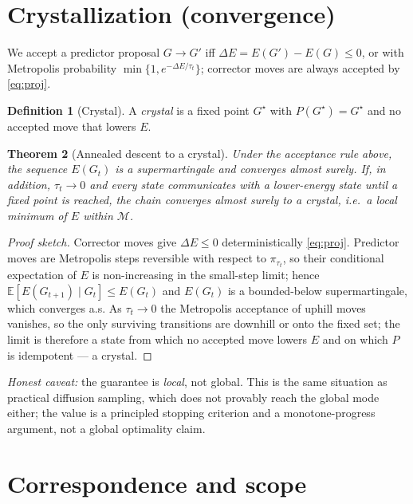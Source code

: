\documentclass[11pt,letterpaper]{article}
\theoremstyle{plain}
\newtheorem{theorem}{Theorem}[section]
\theoremstyle{definition}
\newtheorem{definition}[theorem]{Definition}
\newcommand{\Mani}{\mathcal{M}}
\newcommand{\Proj}{P}
\begin{document}
\section{Crystallization (convergence)}
\label{sec:crystal}



We accept a predictor proposal $G\to G'$ iff $\Delta E=E(G')-E(G)\le 0$, or with
Metropolis probability $\min\{1,e^{-\Delta E/\tau_t}\}$; corrector moves are always
accepted by \eqref{eq:proj}.

\begin{definition}[Crystal]
A \emph{crystal} is a fixed point $G^\star$ with $\Proj(G^\star)=G^\star$ and no
accepted move that lowers $E$.
\end{definition}

\begin{theorem}[Annealed descent to a crystal]
\label{thm:crystal}
Under the acceptance rule above, the sequence $E(G_t)$ is a supermartingale and
converges almost surely. If, in addition, $\tau_t\to 0$ and every state communicates
with a lower-energy state until a fixed point is reached, the chain converges almost
surely to a crystal, i.e.\ a local minimum of $E$ within $\Mani$.
\end{theorem}

\begin{proof}[Proof sketch]
Corrector moves give $\Delta E\le 0$ deterministically \eqref{eq:proj}. Predictor
moves are Metropolis steps reversible with respect to $\pi_{\tau_t}$, so their
conditional expectation of $E$ is non-increasing in the small-step limit; hence
$\mathbb{E}[E(G_{t+1})\mid G_t]\le E(G_t)$ and $E(G_t)$ is a bounded-below
supermartingale, which converges a.s. As $\tau_t\to 0$ the Metropolis acceptance of
uphill moves vanishes, so the only surviving transitions are downhill or onto the
fixed set; the limit is therefore a state from which no accepted move lowers $E$
and on which $\Proj$ is idempotent --- a crystal.
\end{proof}

\emph{Honest caveat:} the guarantee is \emph{local}, not global. This is the same
situation as practical diffusion sampling, which does not provably reach the global
mode either; the value is a principled stopping criterion and a monotone-progress
argument, not a global optimality claim.

\section{Correspondence and scope}
\label{sec:scope}
\end{document}
